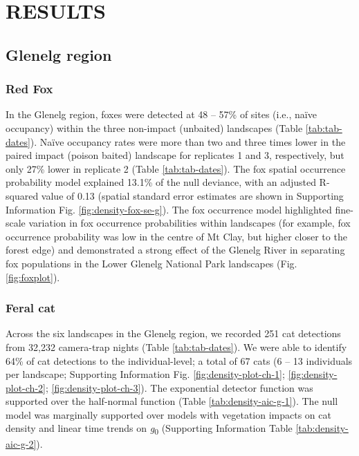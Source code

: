 \documentclass[preprint, 3p, authoryear]{elsarticle} %
\begin{document}
\newpage

\hypertarget{results}{%
\section{RESULTS}\label{results}}

\hypertarget{glenelg-region}{%
\subsection{Glenelg region}\label{glenelg-region}}

\hypertarget{red-fox}{%
\subsubsection{Red Fox}\label{red-fox}}

In the Glenelg region, foxes were detected at 48 -- 57\% of sites (i.e., naïve occupancy) within the three non-impact (unbaited) landscapes (Table \ref{tab:tab-dates}). Naïve occupancy rates were more than two and three times lower in the paired impact (poison baited) landscape for replicates 1 and 3, respectively, but only 27\% lower in replicate 2 (Table \ref{tab:tab-dates}). The fox spatial occurrence probability model explained 13.1\% of the null deviance, with an adjusted R-squared value of 0.13 (spatial standard error estimates are shown in Supporting Information Fig. \ref{fig:density-fox-se-g}). The fox occurrence model highlighted fine-scale variation in fox occurrence probabilities within landscapes (for example, fox occurrence probability was low in the centre of Mt Clay, but higher closer to the forest edge) and demonstrated a strong effect of the Glenelg River in separating fox populations in the Lower Glenelg National Park landscapes (Fig. \ref{fig:foxplot}).

\hypertarget{feral-cat}{%
\subsubsection{Feral cat}\label{feral-cat}}

Across the six landscapes in the Glenelg region, we recorded 251 cat detections from 32,232 camera-trap nights (Table \ref{tab:tab-dates}). We were able to identify 64\% of cat detections to the individual-level; a total of 67 cats (6 -- 13 individuals per landscape; Supporting Information Fig. \ref{fig:density-plot-ch-1}; \ref{fig:density-plot-ch-2}; \ref{fig:density-plot-ch-3}). The exponential detector function was supported over the half-normal function (Table \ref{tab:density-aic-g-1}). The null model was marginally supported over models with vegetation impacts on cat density and linear time trends on \emph{g}\textsubscript{0} (Supporting Information Table \ref{tab:density-aic-g-2}).
\end{document}

